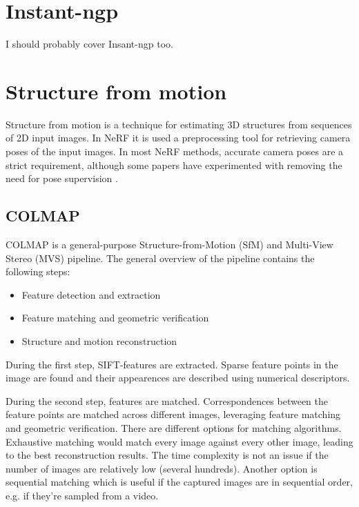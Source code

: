 \section{Instant-ngp}
I should probably cover Insant-ngp too.



\section{Structure from motion} \label{sec:sfm}
Structure from motion is a technique for estimating 3D structures from sequences of 2D input images. In NeRF it is used a preprocessing tool for retrieving camera poses of the input images. In most NeRF methods, accurate camera poses are a strict requirement, although some papers have experimented with removing the need for pose supervision \cite{lin_barf_2021}.

\subsection{COLMAP} \label{sec:colmap}
COLMAP is a general-purpose Structure-from-Motion (SfM) \cite{schoenberger2016sfm} and Multi-View Stereo (MVS) \cite{schoenberger2016mvs} pipeline. The general overview of the pipeline contains the following steps:
\begin{itemize}
    \item Feature detection and extraction
    \item Feature matching and geometric verification
    \item Structure and motion reconstruction
\end{itemize}

During the first step, SIFT-features \cite{Lowe2004} are extracted. Sparse feature points in the image are found and their appearences are described using numerical descriptors.


During the second step, features are matched. Correspondences between the feature points are matched across different images, leveraging feature matching and geometric verification. There are different options for matching algorithms. Exhaustive matching would match every image against every other image, leading to the best reconstruction results. The time complexity is not an issue if the number of images are relatively low (several hundreds). Another option is sequential matching which is useful if the captured images are in sequential order, e.g. if they're sampled from a video.

